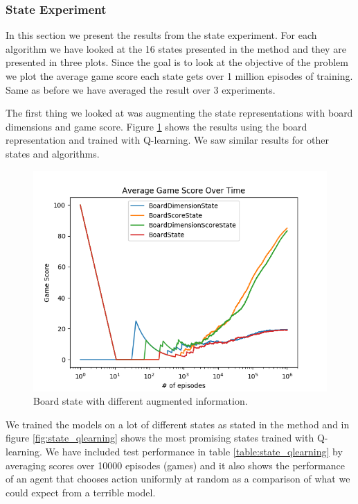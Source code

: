 \documentclass[result.tex]{subfiles}
\begin{document}
    \newpage

    \subsubsection*{State Experiment}

    In this section we present the results from the state experiment. For each algorithm we have looked at the 16 states presented in the method and they are presented in three plots. Since the goal is to look at the objective of the problem we plot the average game score each state gets over 1 million episodes of training. Same as before we have averaged the result over 3 experiments.

    The first thing we looked at was augmenting the state representations with board dimensions and game score. Figure \ref{fig:info_augmentation_board_state} shows the results using the board representation and trained with Q-learning. We saw similar results for other states and algorithms.

    \begin{figure}[ht]
        \centering
        \includegraphics[width=\linewidth]{../images/qlearning/info_augmentation/123/board_state_average_game_score_over_time.png}
        \caption{Board state with different augmented information.}
        \label{fig:info_augmentation_board_state}
    \end{figure}

    \newpage

    We trained the models on a lot of different states as stated in the method and in figure \ref{fig:state_qlearning} shows the most promising states trained with Q-learning. We have included test performance in table \ref{table:state_qlearning} by averaging scores over 10000 episodes (games) and it also shows the performance of an agent that chooses action uniformly at random as a comparison of what we could expect from a terrible model.
\end{document}
